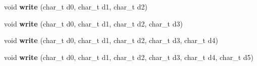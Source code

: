 \begin{DoxyCompactItemize}
\item 
\hypertarget{classxml__buffered__writer_af82b277c1ef5c75d1901bb5a8eb4507f}{}void {\bfseries write} (char\+\_\+t d0, char\+\_\+t d1, char\+\_\+t d2)\label{classxml__buffered__writer_af82b277c1ef5c75d1901bb5a8eb4507f}

\item 
\hypertarget{classxml__buffered__writer_af679f459dfa0af257c190b8db57e7dcb}{}void {\bfseries write} (char\+\_\+t d0, char\+\_\+t d1, char\+\_\+t d2, char\+\_\+t d3)\label{classxml__buffered__writer_af679f459dfa0af257c190b8db57e7dcb}

\item 
\hypertarget{classxml__buffered__writer_aad4a4f18223ec3cb1ff607425119b85f}{}void {\bfseries write} (char\+\_\+t d0, char\+\_\+t d1, char\+\_\+t d2, char\+\_\+t d3, char\+\_\+t d4)\label{classxml__buffered__writer_aad4a4f18223ec3cb1ff607425119b85f}

\item 
\hypertarget{classxml__buffered__writer_ae6af5067d768c24b9c20422f76737f29}{}void {\bfseries write} (char\+\_\+t d0, char\+\_\+t d1, char\+\_\+t d2, char\+\_\+t d3, char\+\_\+t d4, char\+\_\+t d5)\label{classxml__buffered__writer_ae6af5067d768c24b9c20422f76737f29}

\end{DoxyCompactItemize}
